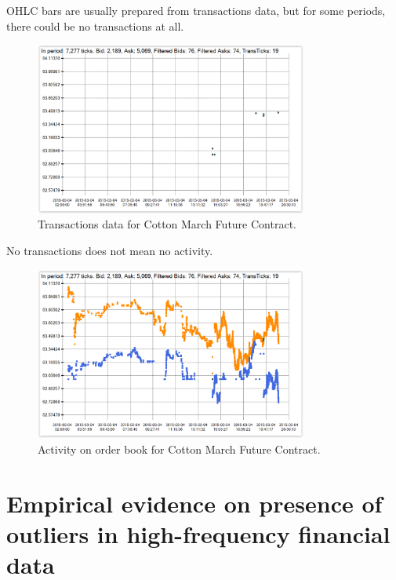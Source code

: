 \documentclass{beamer}
\begin{document}
\begin{frame}{\Large OHLC bars are usually prepared from transactions data, but for some periods, there could be no transactions at all.}

\begin{figure}
    \centering
    \includegraphics[width=0.8\textwidth]{../wykresy/cottonTickH.PNG}
    \caption{Transactions data for Cotton March Future Contract.}
    \label{fig:esh}
\end{figure}

\end{frame}

\begin{frame}{No transactions does not mean no activity.}

\begin{figure}
    \centering
    \includegraphics[width=0.8\textwidth]{../wykresy/cottonOrderH.PNG}
    \caption{Activity on order book for Cotton March Future Contract.}
    \label{fig:esh}
\end{figure}

\end{frame}




\section{Empirical evidence on presence of outliers in high-frequency financial data}
\end{document}

